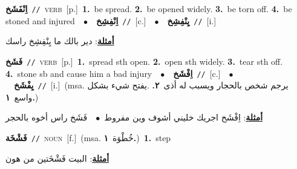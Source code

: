 \documentclass[10pt,a4paper,twoside]{article} %
\begin{document}
\begin{multicols}{2}
{\setlength\topsep{0pt}\textbf{\foreignlanguage{arabic}{اِنْفَشَخ}}\ {\color{gray}\texttt{//}\color{black}}\ \textsc{verb}\ [p.]\ \textbf{1.}~be spread.  \textbf{2.}~be opened widely.  \textbf{3.}~be torn off.  \textbf{4.}~be stoned and injured\ \ $\bullet$\ \ \setlength\topsep{0pt}\textbf{\foreignlanguage{arabic}{اِنْفِشِخ}}\ {\color{gray}\texttt{//}\color{black}}\ [c.]\ \ $\bullet$\ \ \setlength\topsep{0pt}\textbf{\foreignlanguage{arabic}{يِنْفِشِخ}}\ {\color{gray}\texttt{//}\color{black}}\ [i.]\  \begin{flushright}\color{gray}\foreignlanguage{arabic}{\textbf{\underline{\foreignlanguage{arabic}{أمثلة}}}: دير بالك ما يِنْفِشِخ راسك}\end{flushright}\color{black}} \vspace{2mm}

{\setlength\topsep{0pt}\textbf{\foreignlanguage{arabic}{فَشَخ}}\ {\color{gray}\texttt{//}\color{black}}\ \textsc{verb}\ [p.]\ \textbf{1.}~spread sth open.  \textbf{2.}~open sth widely.  \textbf{3.}~tear sth off.  \textbf{4.}~stone sb and cause him a bad injury\ \ $\bullet$\ \ \setlength\topsep{0pt}\textbf{\foreignlanguage{arabic}{اِفْشَخ}}\ {\color{gray}\texttt{//}\color{black}}\ [c.]\ \ $\bullet$\ \ \setlength\topsep{0pt}\textbf{\foreignlanguage{arabic}{يِفْشَخ}}\ {\color{gray}\texttt{//}\color{black}}\ [i.]\ \color{gray}(msa. \foreignlanguage{arabic}{يرجم شخص بالحجار ويسبب له أذى}~\foreignlanguage{arabic}{\textbf{٢.}}  .\foreignlanguage{arabic}{يفتح شيء بشكل واسع}~\foreignlanguage{arabic}{\textbf{١.}})\color{black}\  \begin{flushright}\color{gray}\foreignlanguage{arabic}{\textbf{\underline{\foreignlanguage{arabic}{أمثلة}}}: اِفْشَخ اجريك خليني أشوف وين مفروط\ $\bullet$\ \  فَشَخ راس أخوه بالحجر}\end{flushright}\color{black}} \vspace{2mm}

{\setlength\topsep{0pt}\textbf{\foreignlanguage{arabic}{فَشْخَة}}\ {\color{gray}\texttt{//}\color{black}}\ \textsc{noun}\ [f.]\ \color{gray}(msa. \foreignlanguage{arabic}{خُطْوَة}~\foreignlanguage{arabic}{\textbf{١.}})\color{black}\ \textbf{1.}~step\  \begin{flushright}\color{gray}\foreignlanguage{arabic}{\textbf{\underline{\foreignlanguage{arabic}{أمثلة}}}: البيت فَشْخَتين من هون}\end{flushright}\color{black}} \vspace{2mm}


\end{multicols}
\end{document}
